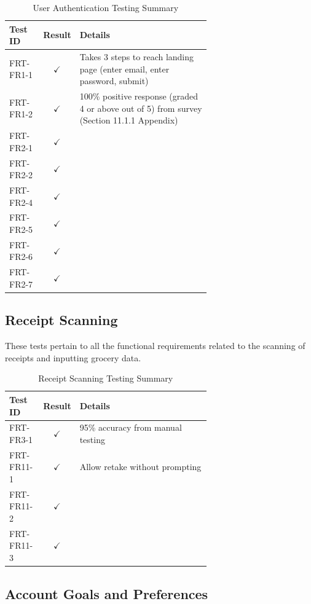 \documentclass[12pt, titlepage]{article}
\begin{document}
\begin{longtable}{|l|c|p{0.65\linewidth}|}
  \caption{User Authentication Testing Summary} \label{User Authentication Testing Summary} \\
  \toprule
  \textbf{Test ID} & \textbf{Result} & \textbf{Details} \\
  \midrule
  FRT-FR1-1 & $\checkmark$ & Takes 3 steps to reach landing page (enter email, enter password, submit) \\
  \midrule
  FRT-FR1-2 & $\checkmark$ & 100\% positive response (graded 4 or above out of 5) from survey (Section 11.1.1 Appendix) \\
  \midrule
  FRT-FR2-1 & $\checkmark$ & \\
  \midrule
  FRT-FR2-2 & $\checkmark$ & \\
  \midrule
  FRT-FR2-4 & $\checkmark$ & \\
  \midrule
  FRT-FR2-5 & $\checkmark$ & \\
  \midrule
  FRT-FR2-6 & $\checkmark$ & \\
  \midrule
  FRT-FR2-7 & $\checkmark$ & \\
  \bottomrule
\end{longtable}

\subsection{Receipt Scanning}

These tests pertain to all the functional requirements related to the scanning
of receipts and inputting grocery data.

\begin{longtable}{|l|c|p{0.65\linewidth}|}
  \caption{Receipt Scanning Testing Summary} \label{Receipt Scanning Testing Summary} \\
  \toprule
  \textbf{Test ID} & \textbf{Result} & \textbf{Details} \\
  \midrule
  FRT-FR3-1 & $\checkmark$ & 95\% accuracy from manual testing\\
  \midrule
  FRT-FR11-1 & $\checkmark$ & Allow retake without prompting \\
  \midrule
  FRT-FR11-2 & $\checkmark$ & \\
  \midrule
  FRT-FR11-3 & $\checkmark$ & \\
  \bottomrule
\end{longtable}

\subsection{Account Goals and Preferences}
\end{document}
